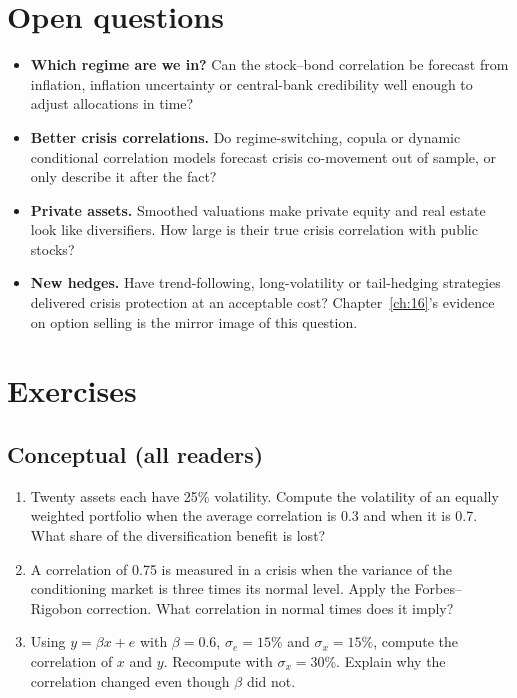 \section{Open questions}
\label{sec:13-open}

\begin{itemize}
  \item \textbf{Which regime are we in?} Can the stock--bond correlation be forecast from inflation, inflation uncertainty or central-bank credibility well enough to adjust allocations in time?
  \item \textbf{Better crisis correlations.} Do regime-switching, copula or dynamic conditional correlation models forecast crisis co-movement out of sample, or only describe it after the fact?
  \item \textbf{Private assets.} Smoothed valuations make private equity and real estate look like diversifiers. How large is their true crisis correlation with public stocks?
  \item \textbf{New hedges.} Have trend-following, long-volatility or tail-hedging strategies delivered crisis protection at an acceptable cost? Chapter~\ref{ch:16}'s evidence on option selling is the mirror image of this question.
\end{itemize}

\section*{Exercises}

\subsection*{Conceptual (all readers)}

\begin{enumerate}
  \item Twenty assets each have 25\% volatility. Compute the volatility of an equally weighted portfolio when the average correlation is 0.3 and when it is 0.7. What share of the diversification benefit is lost?
  \item A correlation of 0.75 is measured in a crisis when the variance of the conditioning market is three times its normal level. Apply the Forbes--Rigobon correction. What correlation in normal times does it imply?
  \item Using $y = \beta x + e$ with $\beta = 0.6$, $\sigma_e = 15\%$ and $\sigma_x = 15\%$, compute the correlation of $x$ and $y$. Recompute with $\sigma_x = 30\%$. Explain why the correlation changed even though $\beta$ did not.
\end{enumerate}

